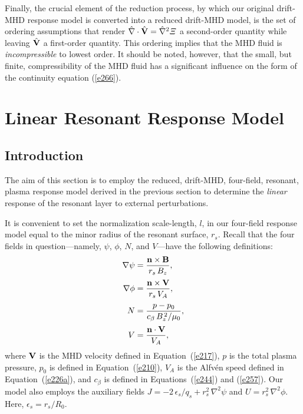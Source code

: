 \documentclass[notitlepage,12pt]{article}
\begin{document}
Finally, the crucial element of the reduction process, by which our original drift-MHD response model is converted into a
reduced drift-MHD model, is the set of ordering assumptions that render $\hat{\nabla}\cdot \hat{\bf V}=\hat{\nabla}^2{\mit\Xi}$
a second-order quantity while leaving $\hat{\bf V}$ a first-order quantity. This ordering implies that the  MHD fluid is
{\em incompressible}\/ to lowest order. It should be noted, however, that the small, but finite, compressibility of the
MHD fluid has a significant influence on the form of the continuity equation (\ref{e266}).

\section{Linear Resonant  Response Model}\label{linear}
\subsection{Introduction}
The aim of this section is to employ the reduced, drift-MHD, four-field, resonant, plasma response model derived in the
previous section to determine the {\em linear}\/ response of the resonant layer to external perturbations.

It is convenient to set the normalization scale-length, $l$, in our four-field response model equal to the minor radius of the resonant surface, $r_s$. 
Recall that the four fields in question---namely, $\psi$, $\phi$, $N$, and $V$---have the following
definitions:
\begin{align}\label{e279}
\nabla\psi &= \frac{{\bf n}\times{\bf B}} {r_s\,B_z},\\[0.5ex]
\nabla\phi &= \frac{{\bf n}\times {\bf V}}{r_s\,V_A},\\[0.5ex]
N &= \frac{p-p_0}{c_\beta\,B_z^{\,2}/\mu_0},\\[0.5ex]
V &= \frac{{\bf n}\cdot {\bf V}}{V_A},
\end{align}
where  ${\bf V}$ is the MHD velocity defined in Equation~(\ref{e217}),  $p$ is the total plasma pressure, $p_0$ is defined in Equation~(\ref{e210}), $V_A$ is the
Alfv\'{e}n speed defined in Equation~(\ref{e226a}), and $c_\beta$ is defined in Equations~(\ref{e244}) and (\ref{e257}). Our
model also employs the auxiliary fields $J=-2\,\epsilon_s/q_s+r_s^2\,\nabla^2 \psi$ and  $U=r_s^2\,\nabla^2 \phi$. Here, $\epsilon_s=r_s/R_0$. 
\end{document}
